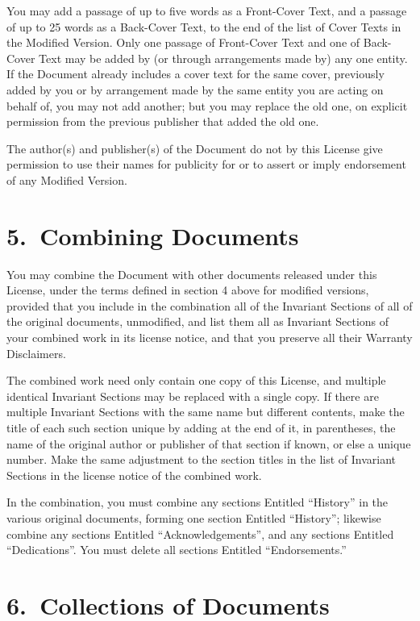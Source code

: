 You may add a passage of up to five words as a Front-Cover Text, and a
passage of up to 25 words as a Back-Cover Text, to the end of the list
of Cover Texts in the Modified Version. Only one passage of
Front-Cover Text and one of Back-Cover Text may be added by (or
through arrangements made by) any one entity. If the Document already
includes a cover text for the same cover, previously added by you or
by arrangement made by the same entity you are acting on behalf of,
you may not add another; but you may replace the old one, on explicit
permission from the previous publisher that added the old one.

The author(s) and publisher(s) of the Document do not by this License
give permission to use their names for publicity for or to assert or
imply endorsement of any Modified Version.



\section*{5.\ Combining Documents}

You may combine the Document with other documents released under this
License, under the terms defined in section 4 above for modified
versions, provided that you include in the combination all of the
Invariant Sections of all of the original documents, unmodified, and
list them all as Invariant Sections of your combined work in its
license notice, and that you preserve all their Warranty Disclaimers.

The combined work need only contain one copy of this License, and
multiple identical Invariant Sections may be replaced with a single
copy. If there are multiple Invariant Sections with the same name but
different contents, make the title of each such section unique by
adding at the end of it, in parentheses, the name of the original
author or publisher of that section if known, or else a unique number.
Make the same adjustment to the section titles in the list of
Invariant Sections in the license notice of the combined work.

In the combination, you must combine any sections Entitled ``History''
in the various original documents, forming one section Entitled
``History''; likewise combine any sections Entitled
``Acknowledgements'', and any sections Entitled ``Dedications''. You
must delete all sections Entitled ``Endorsements.''



\section*{6.\ Collections of Documents}

